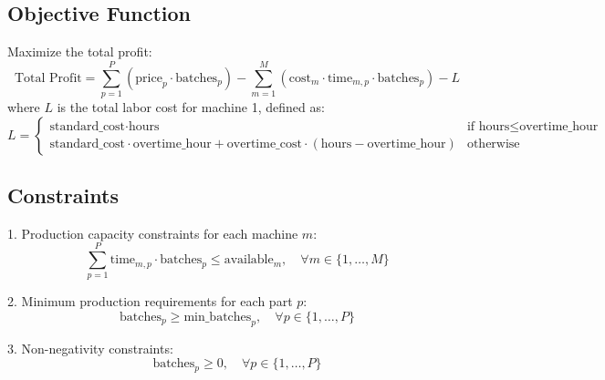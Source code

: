 \documentclass{article}
\begin{document}
\subsection*{Objective Function}
Maximize the total profit:
\[
\text{Total Profit} = \sum_{p=1}^{P} \left( \text{price}_{p} \cdot \text{batches}_{p} \right) - \sum_{m=1}^{M} \left( \text{cost}_{m} \cdot \text{time}_{m,p} \cdot \text{batches}_{p} \right) - L
\]
where \( L \) is the total labor cost for machine 1, defined as:
\[
L = \begin{cases}
\text{standard\_cost} \cdot \text{hours} & \text{if } \text{hours} \leq \text{overtime\_hour} \\
\text{standard\_cost} \cdot \text{overtime\_hour} + \text{overtime\_cost} \cdot (\text{hours} - \text{overtime\_hour}) & \text{otherwise}
\end{cases}
\]

\subsection*{Constraints}
1. Production capacity constraints for each machine \( m \):
\[
\sum_{p=1}^{P} \text{time}_{m,p} \cdot \text{batches}_{p} \leq \text{available}_{m}, \quad \forall m \in \{1, \ldots, M\}
\]

2. Minimum production requirements for each part \( p \):
\[
\text{batches}_{p} \geq \text{min\_batches}_{p}, \quad \forall p \in \{1, \ldots, P\}
\]

3. Non-negativity constraints:
\[
\text{batches}_{p} \geq 0, \quad \forall p \in \{1, \ldots, P\}
\]
\end{document}
